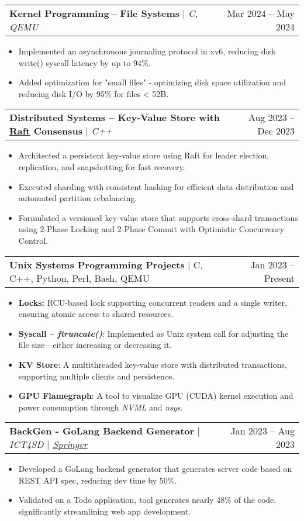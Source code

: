 \documentclass[letterpaper,11pt]{article}
\makeatletter
\newcommand{\resumeItem}[1]{
  \item\small{
    {#1 \vspace{-2pt}}
  }
}
\newcommand{\resumeProjectHeading}[2]{
    \item
    \begin{tabular*}{1.001\textwidth}{l@{\extracolsep{\fill}}r}
      \small#1 & \small #2\\
    \end{tabular*}\vspace{-7pt}
}
\newcommand{\resumeItemListStart}{\begin{itemize}}
\newcommand{\resumeItemListEnd}{\end{itemize}\vspace{-5pt}}
\makeatother
\begin{document}
\resumeProjectHeading
{\textbf{Kernel Programming} -- \textbf{File Systems} $|$ \emph{C, QEMU}}{Mar 2024 -- May 2024}
\resumeItemListStart
\resumeItem{
  Implemented an asynchronous journaling protocol in xv6, reducing disk write() syscall latency by up to 94\%.
}
\resumeItem{
  Added optimization for "small files" - optimizing disk space utilization and reducing disk I/O by 95\% for files \textless{} 52B.
}
\resumeItemListEnd
\vspace{-17pt}

\resumeProjectHeading
{\textbf{\normalsize{Distributed Systems -- Key-Value Store with \href{https://raft.github.io/raft.pdf}{Raft} Consensus}} $|$ \emph{C++}}{Aug 2023 -- Dec 2023}
\resumeItemListStart
\resumeItem{Architected a persistent key-value store using Raft for leader election, replication, and snapshotting for fast recovery.}
\resumeItem{Executed sharding with consistent hashing for efficient data distribution and automated partition rebalancing.}
\resumeItem{Formulated a versioned key-value store that supports cross-shard transactions using 2-Phase Locking and 2-Phase Commit with Optimistic Concurrency Control.}
\resumeItemListEnd
\vspace{-17pt}

\resumeProjectHeading
{\textbf{\normalsize{Unix Systems Programming Projects}} $|$ C, C++, Python, Perl, Bash, QEMU}{Jan 2023 -- Present}
\resumeItemListStart
\resumeItem{\textbf{Locks:} RCU-based lock supporting concurrent readers and a single writer, ensuring atomic access to shared resources.}
\resumeItem{
  \textbf{Syscall -- \textit{ftruncate()}}: Implemented as Unix system call for adjusting the file size—either increasing or decreasing it.
}
\resumeItem{\textbf{KV Store}: A multithreaded key-value store with distributed transactions, supporting multiple clients and persistence.}
\resumeItem{\textbf{GPU Flamegraph}: A tool to visualize GPU (CUDA) kernel execution and power consumption through \textit{NVML} and \textit{nsys}.}
\resumeItemListEnd
\vspace{-17pt}

\resumeProjectHeading
{\textbf{\normalsize{BackGen - GoLang Backend Generator}} $|$ \emph{ICT4SD $|$ \href{https://link.springer.com/chapter/10.1007/978-981-99-6568-7_34}{Springer}}}{Jan 2023 -- Aug 2023}
\resumeItemListStart
\resumeItem{Developed a GoLang backend generator that generates server code based on REST API spec, reducing dev time by 50\%.}
\resumeItem{Validated on a Todo application, tool generates nearly 48\% of the code, significantly streamlining web app development.}
\resumeItemListEnd
\vspace{-17pt}
\end{document}
